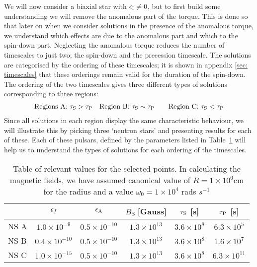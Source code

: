 \documentclass[../full_thesis/full_thesis.tex]{subfiles}
\begin{document}
We will now consider a biaxial star with $\epsilon_{\mathrm{I}}\ne0$, but to first build some
understanding we will remove the anomalous part of the torque. This is done so
that later on when we consider solutions in the presence of the anomalous
torque, we understand which effects are due to the anomalous part and which to
the spin-down part.  Neglecting the anomalous torque reduces the number of
timescales to just two; the spin-down and the precession timescale. The
solutions are categorised by the ordering of these timescales; it is shown  in
appendix \ref{sec: timescales} that these orderings remain valid for the
duration of the spin-down. The ordering of the two timescales gives three
different types of solutions corresponding to three regions:
\begin{align}
    \textrm{Regions A: } \tau_{\mathrm{S}} > \tau_{\mathrm{P}} &&&
    \textrm{Region B: } \tau_{\mathrm{S}} \sim \tau_{\mathrm{P}} &&&
    \textrm{Region C: } \tau_{\mathrm{S}} < \tau_{\mathrm{P}}
\end{align}
Since all solutions in each region display the same characteristic behaviour,
we will illustrate this by picking three `neutron stars' and presenting results
for each of these. Each of these pulsars, defined by the parameters listed
in Table~\ref{tab: A B C params} will help us to understand the types of solutions
for each ordering of the timescales.

\renewcommand{\arraystretch}{1.2}
\begin{table}[htb]
\centering
{\small
	\begin{tabular}[h]{|l|c|c|c|c|c|}\hline
		&  $\epsilon_{I}$  & $\epsilon_{\mathrm{A}} $ & 	$B_{S} \; $[Gauss] & $\tau_{\mathrm{S}}$ [s] & $ \tau_{\mathrm{P}}$  [s] \\ \hline
	NS A 	&  $  1.0\times 10^{-9}  $  & $  0.5\times 10^{-10}  $ & 	$  1.3\times 10^{13}  $   & $  3.6\times 10^{8}  $ & $  6.3\times 10^{5}  $\\
	NS B 	&  $  0.4\times 10^{-10}  $  & $  0.5\times 10^{-10}  $ & 	$  1.3\times 10^{13}  $   & $  3.6\times 10^{8}  $ & $  1.6\times 10^{7}  $\\
	NS C 	&  $  1.0\times 10^{-15}  $  & $  0.5\times 10^{-10}  $ & 	$  1.3\times 10^{13}  $   & $  3.6\times 10^{8}  $ & $  6.3\times 10^{11}  $\\ \hline
	\end{tabular}
}
\caption{Table of relevant values for the selected points. In calculating the
    magnetic fields, we have assumed canonical value of $R=1\times10^{6}$cm for
    the radius and a value $\omega_{0} = 1\times10^{4}$ rads $s^{-1}$}
\label{tab: A B C params}
\end{table}
\end{document}

